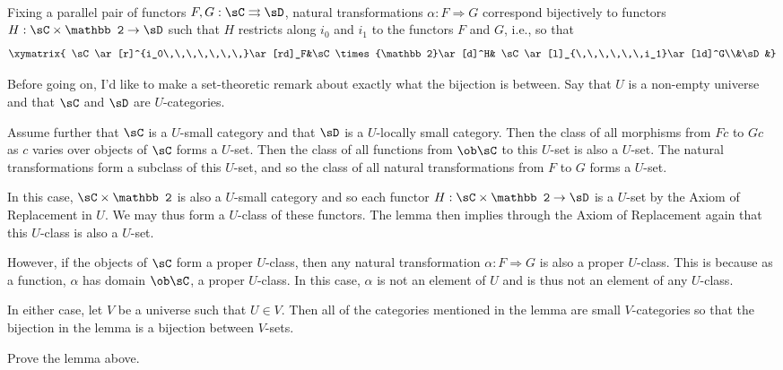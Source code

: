 \documentclass[../../main]{subfiles}
\begin{document}
\paragraph{}
\begin{lemma}
	Fixing a parallel pair of functors $F,G:\sC\rightrightarrows\sD$, natural
	transformations $\alpha:F\Rightarrow G$ correspond bijectively to functors
	$H:\sC\times{\mathbb 2}\rightarrow\sD$ such that $H$ restricts along $i_0$
	and $i_1$ to the functors $F$ and $G$, i.e., so that
	\[\xymatrix{
			\sC\ar[r]^{i_0\,\,\,\,\,\,\,}\ar[rd]_F&\sC\times{\mathbb 2}\ar[d]^H&
	\sC\ar[l]_{\,\,\,\,\,\,i_1}\ar[ld]^G\\&\sD&}\]
\end{lemma}
\popthm

Before going on, I'd like to make a set-theoretic remark about exactly what the
bijection is between. Say that $U$ is a non-empty universe and that $\sC$ and
$\sD$ are $U$-categories.

Assume further that $\sC$ is a $U$-small category and that $\sD$ is a
$U$-locally small category. Then the class of all morphisms from $Fc$ to $Gc$ as
$c$ varies over objects of $\sC$ forms a $U$-set. Then the class of all
functions from $\ob\sC$ to this $U$-set is also a $U$-set. The natural
transformations form a subclass of this $U$-set, and so the class of all natural
transformations from $F$ to $G$ forms a $U$-set.

In this case, $\sC\times{\mathbb 2}$ is also a $U$-small category and so each
functor $H:\sC\times{\mathbb 2}\rightarrow\sD$ is a $U$-set by the Axiom of
Replacement in $U$. We may thus form a $U$-class of these functors. The lemma
then implies through the Axiom of Replacement again that this $U$-class is also
a $U$-set.

However, if the objects of $\sC$ form a proper $U$-class, then any natural
transformation $\alpha:F\Rightarrow G$ is also a proper $U$-class. This is
because as a function, $\alpha$ has domain $\ob\sC$, a proper $U$-class. In this
case, $\alpha$ is not an element of $U$ and is thus not an element of any
$U$-class.

In either case, let $V$ be a universe such that $U\in V$. Then all of the
categories mentioned in the lemma are small $V$-categories so that the bijection
in the lemma is a bijection between $V$-sets.

\begin{exercise}
	Prove the lemma above.
\end{exercise}
\end{document}
